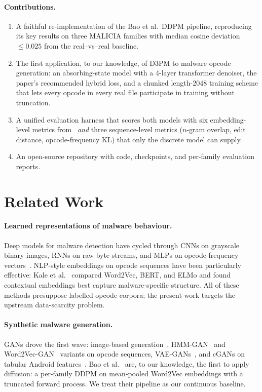 \documentclass[runningheads]{llncs}
\begin{document}
\paragraph{Contributions.}
\begin{enumerate}
\item A faithful re-implementation of the Bao et al.\ DDPM pipeline,
      reproducing its key results on three MALICIA families with median
      cosine deviation $\le 0.025$ from the real--vs--real baseline.
\item The first application, to our knowledge, of D3PM to malware opcode
      generation: an absorbing-state model with a 4-layer transformer denoiser,
      the paper's recommended hybrid loss, and a chunked length-2048 training
      scheme that lets every opcode in every real file participate in training
      without truncation.
\item A unified evaluation harness that scores both models with six
      embedding-level metrics from~\cite{bao2025diffusion} \emph{and} three
      sequence-level metrics ($n$-gram overlap, edit distance, opcode-frequency
      KL) that only the discrete model can supply.
\item An open-source repository with code, checkpoints, and per-family
      evaluation reports.
\end{enumerate}

\section{Related Work}
\label{sec:related}

\paragraph{Learned representations of malware behaviour.}
Deep models for malware detection have cycled through CNNs on grayscale binary
images, RNNs on raw byte streams, and MLPs on opcode-frequency
vectors~\cite{jain2021cnn,pascanu2015rnn}. NLP-style embeddings on opcode
sequences have been particularly effective: Kale et al.~\cite{kale2023bert}
compared Word2Vec, BERT, and ELMo and found contextual embeddings best capture
malware-specific structure. All of these methods presuppose labelled opcode
corpora; the present work targets the upstream data-scarcity problem.

\paragraph{Synthetic malware generation.}
GANs drove the first wave: image-based generation~\cite{lu2019gan},
HMM-GAN~\cite{trehan2022hmmgan} and Word2Vec-GAN~\cite{tran2022word2vec}
variants on opcode sequences, VAE-GANs~\cite{choi2024vaegan}, and cGANs on
tabular Android features~\cite{nogueira2025android}.
Bao et al.~\cite{bao2025diffusion} are, to our knowledge, the first to apply
diffusion: a per-family DDPM on mean-pooled Word2Vec embeddings with a
truncated forward process. We treat their pipeline as our continuous baseline.
\end{document}
